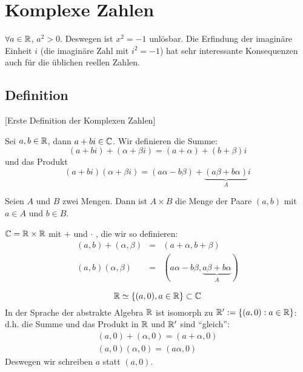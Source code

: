 \section{Komplexe Zahlen}
\begin{Bem}
  $\forall a\in \mathbb{R}$, $a^2>0$. Deswegen ist $x^2=-1$ unlösbar.
  Die Erfindung der imagin\"are Einheit $i$ (die imaginäre Zahl mit $i^2=-1$) 
hat sehr interessante Konsequenzen auch für die üblichen reellen Zahlen.
\end{Bem}
\subsection{Definition}[Erste Definition der Komplexen Zahlen]\label{d:C1}
\begin{Def} Sei $a,b\in\mathbb{R}$, dann $a+bi\in\mathbb{C}$. Wir definieren die Summe:
  \begin{equation*}
    (a+bi)+(\alpha+\beta i) = (a+\alpha)+(b+\beta)i
\end{equation*}
und das Produkt
\begin{equation*}
    (a+bi)(\alpha+\beta i) = (a\alpha-b\beta)+ \underbrace{(a\beta+b\alpha)}_A i
  \end{equation*}
\end{Def}
\begin{Def}
  Seien $A$ und $B$ zwei Mengen. Dann ist $A\times B$ die Menge der Paare $(a,b)$ mit $a\in A$ und $b\in B$.
\end{Def}
\begin{Def}\label{d:C2}
  $\mathbb{C}=\mathbb{R}\times\mathbb{R}$ mit $+$ und $\cdot$ , die wir so definieren:
  \begin{eqnarray*}
    (a,b)+(\alpha,\beta)&=&(a+\alpha,b+\beta)\\
    (a,b)(\alpha,\beta)&=&(a\alpha-b\beta, \underbrace{a\beta+b\alpha}_{A})
  \end{eqnarray*}
\end{Def}
\begin{Bem}
  \begin{equation*}
    \mathbb{R}\simeq \left\{ (a,0), a\in\mathbb{R} \right\}\subset\mathbb{C}\\
\end{equation*}
In der Sprache der abstrakte Algebra $\mathbb{R}$ ist isomorph zu 
$\mathbb{R}' := \{(a,0):a\in \mathbb{R}\}$: d.h. die Summe und 
das Produkt in $\mathbb{R}$ und $\mathbb{R}'$ sind ``gleich'': 
\begin{eqnarray*} 
    (a,0)+(\alpha,0)=(a+\alpha,0)\\
    (a,0)(\alpha,0)=(a\alpha,0)
  \end{eqnarray*}
Deswegen wir schreiben $a$ statt $(a,0)$.
\end{Bem}
